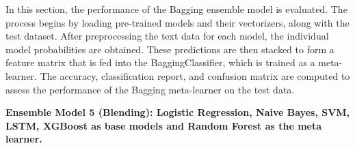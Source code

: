 \noindent
In this section, the performance of the Bagging ensemble model is evaluated. The process begins by loading pre-trained models and their vectorizers, along with the test dataset. After preprocessing the text data for each model, the individual model probabilities are obtained. These predictions are then stacked to form a feature matrix that is fed into the BaggingClassifier, which is trained as a meta-learner. The accuracy, classification report, and confusion matrix are computed to assess the performance of the Bagging meta-learner on the test data.

\pagebreak

\noindent
\textbf{Ensemble Model 5 (Blending): Logistic Regression, Naive Bayes, SVM, LSTM, XGBoost as base models and Random Forest as the meta learner. }


